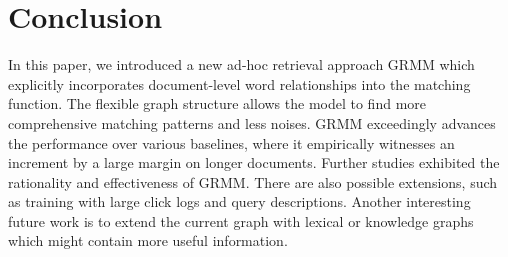 \section{Conclusion}
In this paper, we introduced a new ad-hoc retrieval approach GRMM which explicitly incorporates document-level word relationships into the matching function. The flexible graph structure allows the model to find more comprehensive matching patterns and less noises. GRMM exceedingly advances the performance over various baselines, where it empirically witnesses an increment by a large margin on longer documents. Further studies exhibited the rationality and effectiveness of GRMM. There are also possible extensions, such as training with large click logs \cite{jiang2016learning} and query descriptions. Another interesting future work is to extend the current graph with lexical or knowledge graphs which might contain more useful information. 